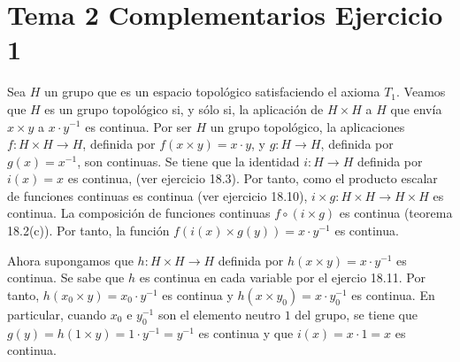 \documentclass{article}
\begin{document}
\section{Tema 2 Complementarios Ejercicio 1}
Sea $H$ un grupo que es un espacio topológico satisfaciendo el axioma $T_1$. Veamos que $H$ es un grupo topológico si, y sólo si, la aplicación de $H\times H$ a $H$ que envía $x\times y$ a $x\cdot y^{-1}$ es continua. Por ser $H$ un grupo topológico, la aplicaciones $f:H\times H\rightarrow H$, definida por $f(x\times y )=x\cdot y$, y $g:H\rightarrow H$, definida por $g(x)=x^{-1}$, son continuas. Se tiene que la identidad $i:H\rightarrow H$ definida por $i(x)=x$ es continua, (ver ejercicio 18.3). Por tanto, como el producto escalar de funciones continuas es continua (ver ejercicio 18.10), $i\times g: H\times H\rightarrow H\times H$ es continua. La composición de funciones continuas $f\circ (i\times g)$ es continua (teorema 18.2(c)). Por tanto, la función $f(i(x)\times g(y))=x\cdot y^{-1}$ es continua.

Ahora supongamos que $h: H\times H\rightarrow H$ definida por $h(x\times y)= x\cdot y^{-1}$ es continua. Se sabe que $h$ es continua en cada variable por el ejercio 18.11. Por tanto, $h(x_0\times y) = x_0 \cdot y^{-1}$ es continua y $h(x\times y_0) = x\cdot y^{-1}_0$ es continua. En particular, cuando $x_0$ e $y^{-1}_0$ son el elemento neutro $1$ del grupo, se tiene que $g(y)=h(1\times y) =  1\cdot y^{-1}=y^{-1}$ es continua y que $i(x)=x\cdot 1=x$ es continua.
\end{document}
